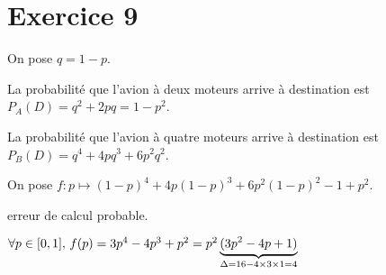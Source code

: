 \part{Exercice 9}

On pose $q = 1 - p$.

La probabilité que l'avion à deux moteurs arrive à destination est $P_A(D) = q^2 + 2pq = 1 - p^2$.

La probabilité que l'avion à quatre moteurs arrive à destination est $P_B(D) = q^4 + 4pq^3 + 6p^2q^2$.

On pose $f : p \mapsto (1-p)^4 + 4p(1-p)^3 + 6p^2(1-p)^2 - 1 + p^2$.

\danger erreur de calcul probable.


$\forall p \in [0,1],\,f(p) = 3p^4 - 4p^3 + p^2 = p^2\underbrace{(3p^2 - 4 p + 1)}_{\mathclap{\Delta = 16 - 4 \times 3 \times 1 = 4}}$

\begin{center}
\end{center}

